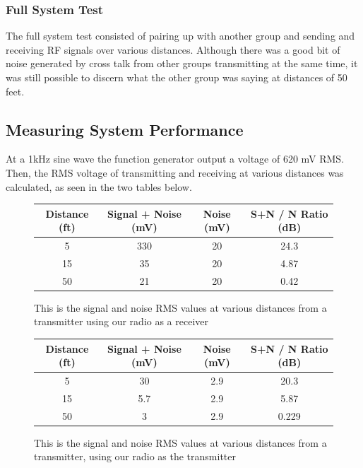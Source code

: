 \documentclass[10pt]{article}
\begin{document}
\subsubsection{Full System Test}

The full system test consisted of pairing up with another group and sending and receiving RF signals over various distances. Although there was a good bit of noise generated by cross talk from other groups transmitting at the same time, it was still possible to discern what the other group was saying at distances of 50 feet.

\subsection{Measuring System Performance}

At a 1kHz sine wave the function generator output a voltage of 620 mV RMS.
Then, the RMS voltage of transmitting and receiving at various distances was calculated, as seen in the two tables below. 

\begin{figure} [H]
	\begin{table}[H]
		\centering
		\begin{tabular}{||c c c c||} 
			\hline
			Distance (ft) & Signal + Noise (mV) &  Noise (mV)& S+N / N Ratio (dB)\\ [0.5ex] 
			\hline\hline
			5 & 330 & 20 & 24.3\\ 
			15 & 35 & 20 & 4.87\\
			50 & 21 & 20 & 0.42\\ [1ex] 
			\hline
		\end{tabular}
	\end{table}
	\caption{This is the signal and noise RMS values at various distances from a transmitter using our radio as a receiver}
	\label{RecieveSNR}
\end{figure}

\begin{figure} [H]
	\begin{table}[H]
		\centering
		\begin{tabular}{||c c c c||} 
			\hline
			Distance (ft) & Signal + Noise (mV) &  Noise (mV) & S+N / N Ratio (dB)\\ [0.5ex] 
			\hline\hline
			5 & 30 & 2.9 & 20.3\\ 
			15 & 5.7 & 2.9 & 5.87\\
			50 & 3 & 2.9 & 0.229\\ [1ex] 
			\hline
		\end{tabular}
	\end{table}
	\caption{This is the signal and noise RMS values at various distances from a transmitter, using our radio as the transmitter}
	\label{TransmitSNR}
\end{figure}
\end{document}
